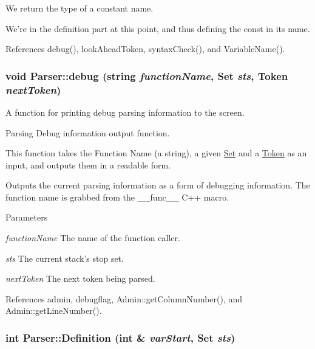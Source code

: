 We return the type of a constant name. 

We're in the definition part at this point, and thus defining the const in its name. 

References debug(), lookAheadToken, syntaxCheck(), and VariableName().

\hypertarget{classParser_a862ea4d5a0d322471e3183aa4d51ad4b}{
\subsubsection[{debug}]{\setlength{\rightskip}{0pt plus 5cm}void Parser::debug (string {\em functionName}, \/  {\bf Set} {\em sts}, \/  {\bf Token} {\em nextToken})}}
\label{classParser_a862ea4d5a0d322471e3183aa4d51ad4b}


A function for printing debug parsing information to the screen. 

Parsing Debug information output function.

This function takes the Function Name (a string), a given \hyperlink{classSet}{Set} and a \hyperlink{classToken}{Token} as an input, and outputs them in a readable form.

Outputs the current parsing information as a form of debugging information. The function name is grabbed from the \_\-\_\-func\_\-\_\- C++ macro.


\begin{DoxyParams}{Parameters}
\item[{\em functionName}]The name of the function caller. \item[{\em sts}]The current stack's stop set. \item[{\em nextToken}]The next token being parsed. \end{DoxyParams}


References admin, debugflag, Admin::getColumnNumber(), and Admin::getLineNumber().

\hypertarget{classParser_a164c3a4ff56a3c75d9d26c8c47178b68}{
\subsubsection[{Definition}]{\setlength{\rightskip}{0pt plus 5cm}int Parser::Definition (int \& {\em varStart}, \/  {\bf Set} {\em sts})}}
\label{classParser_a164c3a4ff56a3c75d9d26c8c47178b68}


